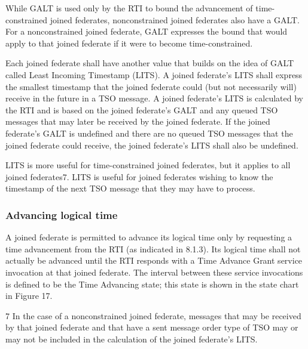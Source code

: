 \begin{compactstdpage}
    While GALT is used only by the RTI to bound the advancement of time-constrained joined federates, nonconstrained joined federates also have a GALT. For a nonconstrained joined federate, GALT expresses the bound that would apply to that joined federate if it were to become time-constrained.

    Each joined federate shall have another value that builds on the idea of GALT called Least Incoming Timestamp (LITS). A joined federate's LITS shall express the smallest timestamp that the joined federate could (but not necessarily will) receive in the future in a TSO message. A joined federate's LITS is calculated by the RTI and is based on the joined federate's GALT and any queued TSO messages that may later be received by the joined federate. If the joined federate's GALT is undefined and there are no queued TSO messages that the joined federate could receive, the joined federate's LITS shall also be undefined.

    LITS is more useful for time-constrained joined federates, but it applies to all joined federates7. LITS is useful for joined federates wishing to know the timestamp of the next TSO message that they may have to process.

    \subsubsection{Advancing logical time}

    A joined federate is permitted to advance its logical time only by requesting a time advancement from the RTI (as indicated in 8.1.3). Its logical time shall not actually be advanced until the RTI responds with a Time Advance Grant \rtiinitiated{} service invocation at that joined federate. The interval between these service invocations is defined to be the Time Advancing state; this state is shown in the state chart in Figure 17.

    7 In the case of a nonconstrained joined federate, messages that may be received by that joined federate and that have a sent message order type of TSO may or may not be included in the calculation of the joined federate's LITS.


\end{compactstdpage}

\clearpage

